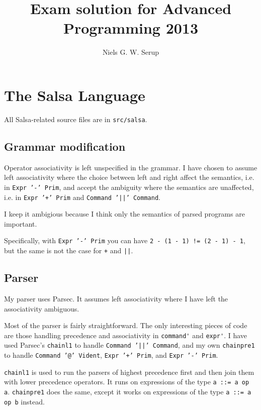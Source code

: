 \documentclass[10pt,a4paper]{article}
\title{Exam solution for Advanced Programming 2013}
\author{Niels G. W. Serup}
\begin{document}
\adjustdocument
\maketitle
\tableofcontents


\newpage
\section{The Salsa Language}

All Salsa-related source files are in \verb+src/salsa+.


\subsection{Grammar modification}

Operator associativity is left unspecified in the grammar.  I have chosen to
assume left associativity where the choice between left and right affect the
semantics, i.e. in \texttt{Expr '-' Prim}, and accept the ambiguity where the
semantics are unaffected, i.e. in \texttt{Expr '+' Prim} and \texttt{Command 
'||' Command}.

I keep it ambigious because I think only the semantics of parsed programs are
important.

Specifically, with \texttt{Expr '-' Prim} you can have \texttt{2 - (1 - 1) != (2
  - 1) - 1}, but the same is not the case for \texttt{+} and \texttt{||}.


\subsection{Parser}

My parser uses Parsec.  It assumes left associativity where I have left the
associativity ambiguous.

Most of the parser is fairly straightforward.  The only interesting pieces of
code are those handling precedence and associativity in \verb+command'+ and
\verb+expr'+.  I have used Parsec's \verb+chainl1+ to handle \texttt{Command
  '||' Command}, and my own \verb+chainpre1+ to handle \texttt{Command '@'
  Vident}, \texttt{Expr '+' Prim}, and \texttt{Expr '-' Prim}.

\verb+chainl1+ is used to run the parsers of highest precedence first and then
join them with lower precedence operators.  It runs on expressions of the type
\verb+a ::= a op a+. \verb+chainpre1+ does the same, except it works on
expressions of the type \verb+a ::= a op b+ instead.
\end{document}
